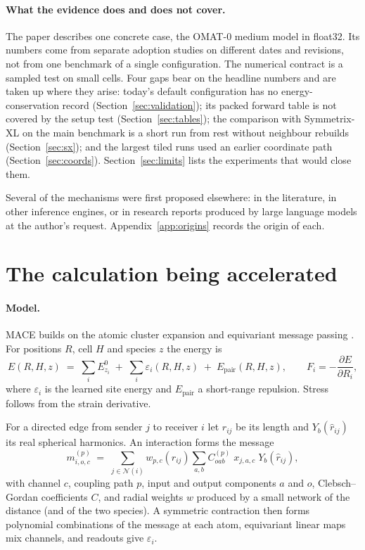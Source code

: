 \documentclass[11pt]{article}
\begin{document}
\paragraph{What the evidence does and does not cover.}
The paper describes one concrete case, the OMAT-0 medium model in float32. Its numbers come from separate
adoption studies on different dates and revisions, not from one benchmark of a single configuration. The
numerical contract is a sampled test on small cells. Four gaps bear on the headline numbers and are taken up
where they arise: today's default configuration has no energy-conservation record
(Section~\ref{sec:validation}); its packed forward table is not covered by the setup test
(Section~\ref{sec:tables}); the comparison with Symmetrix-XL on the main benchmark is a short run from rest
without neighbour rebuilds (Section~\ref{sec:sx}); and the largest tiled runs used an earlier coordinate path
(Section~\ref{sec:coords}). Section~\ref{sec:limits} lists the experiments that would close them.

Several of the mechanisms were first proposed elsewhere: in the literature, in other inference engines, or in
research reports produced by large language models at the author's request. Appendix~\ref{app:origins} records
the origin of each.

\section{The calculation being accelerated}
\label{sec:background}

\paragraph{Model.}
MACE \cite{batatia2022mace} builds on the atomic cluster expansion \cite{drautz2019ace} and equivariant message
passing \cite{batzner2022nequip,geiger2022e3nn}. For positions $R$, cell $H$ and species $z$ the energy is
\begin{equation}
E(R,H,z) \;=\; \sum_i E^{0}_{z_i} \;+\; \sum_i \varepsilon_i(R,H,z) \;+\; E_{\text{pair}}(R,H,z),
\qquad F_i = -\frac{\partial E}{\partial R_i},
\end{equation}
where $\varepsilon_i$ is the learned site energy and $E_{\text{pair}}$ a short-range repulsion. Stress follows
from the strain derivative.

For a directed edge from sender $j$ to receiver $i$ let $r_{ij}$ be its length and $Y_b(\hat r_{ij})$ its real
spherical harmonics. An interaction forms the message
\begin{equation}
m^{(p)}_{i,o,c} \;=\; \sum_{j \in \mathcal N(i)} w_{p,c}(r_{ij})
\sum_{a,b} C^{(p)}_{oab}\; x_{j,a,c}\; Y_b(\hat r_{ij}),
\label{eq:message}
\end{equation}
with channel $c$, coupling path $p$, input and output components $a$ and $o$, Clebsch--Gordan coefficients $C$,
and radial weights $w$ produced by a small network of the distance (and of the two species). A symmetric
contraction then forms polynomial combinations of the message at each atom, equivariant linear maps mix channels,
and readouts give $\varepsilon_i$.
\end{document}
